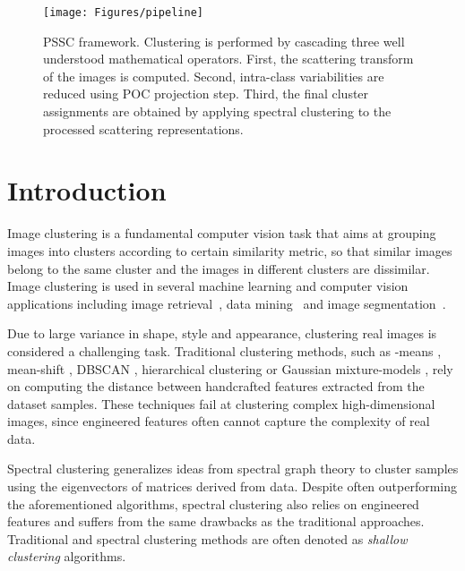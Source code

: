 \documentclass[11pt]{article}
\theoremstyle{definition}
\begin{document}
\begin{figure*}[t]
	\centering
	\texttt{[image: Figures/pipeline]}
	\caption{PSSC framework. Clustering is performed by cascading three well understood mathematical operators. First, the scattering transform of the images is computed. Second, intra-class variabilities are reduced using POC projection step. Third, the final cluster assignments are obtained by applying spectral clustering to the processed scattering representations.}
	\label{fig:clustering pipeline}
	\vspace{-0.15cm}
\end{figure*}


\section{Introduction}\label{sec:introduction}

Image clustering is a fundamental computer vision task that aims at grouping images into clusters according to certain similarity metric, so that similar images belong to the same cluster and the images in different clusters are dissimilar. Image clustering is used in several machine learning and computer vision applications including image retrieval~\cite{Chen_ContentBasedImageRetrievalClustering_2003, Murthy_ContetBasedImageRetrievalKMeansClustering_2010}, data mining~\cite{Verma_ComparativeStudyClusteringForDataMining_2012} and image segmentation~\cite{Chuang_FuzzyKMeansImageSegmentation_2006, Dhanachandra_ImageSegementationThroughClustering_2015}.

Due to large variance in shape, style and appearance, clustering real images is considered a challenging task. Traditional clustering methods, such as -means \cite{Macqueen_KMeansClustering_1967}, mean-shift \cite{Comaniciu_MeanShift_2002}, DBSCAN \cite{Ester_DBSCANDensityBasedClustering_1996}, hierarchical clustering \cite{Johnson_HierarchicalClustering_1967} or Gaussian mixture-models \cite{Reynolds_GaussianMixtureModels_2009}, rely on computing the distance between handcrafted features extracted from the dataset samples. These techniques fail at clustering complex high-dimensional images, since engineered features often cannot capture the complexity of real data.

Spectral clustering \cite{Ng_SpectralClustering_2002, Luxburg_SpectralClusteringTutorial_2007} generalizes ideas from spectral graph theory to cluster samples using the eigenvectors of matrices derived from data. Despite often outperforming the aforementioned algorithms, spectral clustering also relies on engineered features and suffers from the same drawbacks as the traditional approaches. Traditional and spectral clustering methods are often denoted as \textit{shallow clustering} algorithms.
\end{document}
